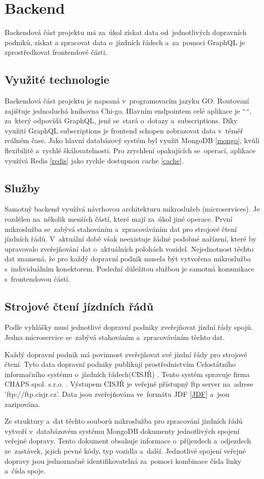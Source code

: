 \section{Backend}
Backendová část projektu má za~úkol získat data od~jednotlivých dopravních podniků, získat a zpracovat data o~jízdních řádech \cite{cisjr} a~za~pomoci GraphQL je zprostředkovat frontendové části.
\subsection{Využité technologie} Backendová část projektu je napsaná v~programovacím jazyku GO. Routovaní zajišťuje jednoduchá knihovna Chi-go. Hlavním endpointem celé aplikace je ““, za~který odpovídá GraphQL, jenž se~stará o~dotazy a~subscriptions. Díky využití GraphQL subscriptions je frontend schopen zobrazovat data v~téměř reálném čase. Jako hlavní databázový systém byl využit MongoDB \ref{mongo}, kvůli flexibilitě a~rychlé škálovatelnosti. Pro zrychlení opakujících se~operací, aplikace využívá Redis \ref{redis} jako rychle dostupnou cache \ref{cache}. \par
\subsection{Služby}
Samotný backend využívá návrhovou architekturu mikroslužeb (microservices). Je rozdělen na~několik menších částí, které mají za~úkol jiné operace. První mikroslužba se~zabývá stahováním a~zpracováváním dat pro strojové čtení jízdních řádů. V~aktuální době však neexistuje žádné podobné nařízení, které by upravovalo zveřejňování dat o~aktuálních polohách vozidel. Nejednotnost těchto dat znamená, že pro každý dopravní podnik musela být vytvořena mikroslužba s~individuálním konektorem. Poslední důležitou službou je samotná komunikace s~frontendovou částí.
\subsection [Jízdní řády]{Strojové čtení jízdních řádů} \label{strojoveCteniJR}
Podle vyhlášky \cite{vyhlaskaJizdniRady} musí jednotlivé dopravní podniky zveřejňovat jízdní řády spojů. Jedna microservice se~zabývá stahováním a~zpracováváním těchto dat. \par
Každý dopravní podnik má povinnost zveřejňovat své jízdní řády pro strojové čtení. Tyto data dopravní podniky publikují prostřednictvím Celostátního informačního systému o~jízdních řádech(CISJŘ) \cite{cisjr}. Tento systém spravuje firma CHAPS spol. s.r.o. \cite{chaps}. Výstupem CISJŘ je veřejně přístupný ftp server na~adrese 'ftp://ftp.cisjr.cz'. Data jsou zveřejňována ve~formátu JDF \ref{JDF} a~jsou zazipována. \par
Ze struktury a~dat těchto souborů mikroslužba pro zpracování jízdních řádů vytvoří v~databázovém systému MongoDB dokumenty jednotlivých spojení veřejné dopravy. Tento dokument obsahuje informace o~příjezdech a~odjezdech ze~zastávek, jejich pevné kódy, typ vozidla a~další. Jednotlivé spojení veřejné dopravy jsou jednoznačně identifikovatelná za~pomoci kombinace čísla linky a~čísla spoje.
